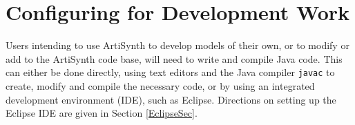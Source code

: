 \documentclass{article}
\begin{document}
%
%
%
%
%
%

\section{Configuring for Development Work}
\label{SettingsForDevelopmentSec}

Users intending to use ArtiSynth to develop models of their own, or to
modify or add to the ArtiSynth code base, will need to write and
compile Java code. This can either be done directly, using text
editors and the Java compiler {\tt javac} to create, modify and compile
the necessary code, or by using an integrated development
environment (IDE), such as Eclipse.  Directions on setting up the
Eclipse IDE are given in Section \ref{EclipseSec}.
\end{document}

